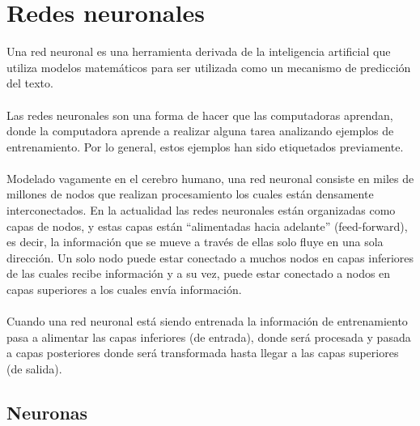 \documentclass[12pt, a4paper, titlepage]{report}
\begin{document}
	    \section{Redes neuronales}
	    Una red neuronal es una herramienta derivada de la inteligencia artificial que utiliza modelos matemáticos para ser utilizada como un mecanismo de predicción del texto.\\\\
		Las redes neuronales son una forma de hacer que las computadoras aprendan, donde la computadora aprende a realizar alguna tarea analizando ejemplos de entrenamiento. Por lo general, estos ejemplos han sido etiquetados previamente.\\\\
		Modelado vagamente en el cerebro humano, una red neuronal consiste en miles de millones de nodos que realizan procesamiento los cuales están densamente interconectados. En la actualidad las redes neuronales están organizadas como capas de nodos, y estas capas están “alimentadas hacia adelante” (feed-forward), es decir, la información que se mueve a través de ellas solo fluye en una sola dirección. Un solo nodo puede estar conectado a muchos nodos en capas inferiores de las cuales recibe información y a su vez, puede estar conectado a nodos en capas superiores a los cuales envía información.\\\\
		Cuando una red neuronal está siendo entrenada la información de entrenamiento pasa a alimentar las capas inferiores (de entrada), donde será procesada y pasada a capas posteriores donde será transformada hasta llegar a las capas superiores (de salida).\cite{refQueSonRedesNeu}

				\subsection{Neuronas}
\end{document}
